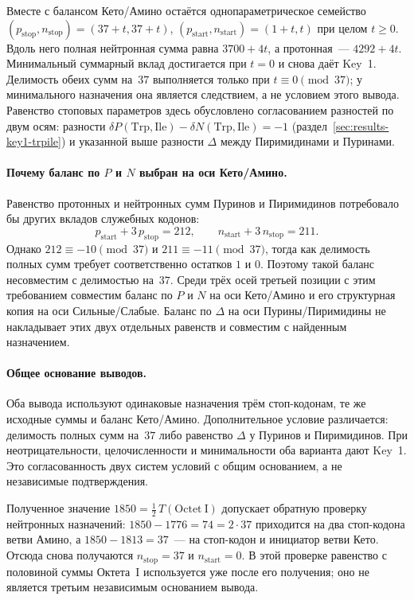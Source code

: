 \documentclass[11pt,a4paper]{article}
\renewcommand{\_}{\origunderscore\allowbreak}
\begin{document}
Вместе с балансом Кето/Амино остаётся однопараметрическое семейство
$(p_{\text{stop}},n_{\text{stop}})=(37+t,37+t)$,
$(p_{\text{start}},n_{\text{start}})=(1+t,t)$ при целом $t\ge0$.
Вдоль него полная нейтронная сумма равна $3700+4t$,
а протонная~--- $4292+4t$. Минимальный суммарный вклад
достигается при $t=0$ и снова даёт Key~1.
Делимость обеих сумм на~$37$ выполняется только при
$t\equiv0\pmod{37}$; у минимального назначения она
является следствием, а не условием этого вывода.
Равенство стоповых параметров здесь обусловлено
согласованием разностей по двум осям: разности
$\delta P(\mathrm{Trp},\mathrm{Ile})-
\delta N(\mathrm{Trp},\mathrm{Ile})=-1$
(раздел~\ref{sec:results-key1-trpile}) и указанной выше
разности $\Delta$ между Пиримидинами и Пуринами.

\paragraph{Почему баланс по $P$ и $N$ выбран на оси Кето/Амино.}
Равенство протонных и нейтронных сумм Пуринов и Пиримидинов
потребовало бы других вкладов служебных кодонов:
\[
p_{\text{start}}+3\,p_{\text{stop}}=212,
\qquad n_{\text{start}}+3\,n_{\text{stop}}=211.
\]
Однако $212\equiv-10\pmod{37}$ и
$211\equiv-11\pmod{37}$, тогда как делимость полных сумм
требует соответственно остатков $1$ и $0$.
Поэтому такой баланс несовместим с делимостью на~$37$.
Среди трёх осей третьей позиции с этим требованием совместим
баланс по $P$ и $N$ на оси Кето/Амино и его структурная
копия на оси Сильные/Слабые. Баланс по $\Delta$ на оси
Пурины/Пиримидины не накладывает этих двух отдельных
равенств и совместим с найденным назначением.

\paragraph{Общее основание выводов.}
Оба вывода используют одинаковые назначения трём стоп-кодонам,
те же исходные суммы и баланс Кето/Амино. Дополнительное
условие различается: делимость полных сумм на~$37$ либо
равенство $\Delta$ у Пуринов и Пиримидинов. При
неотрицательности, целочисленности и минимальности оба
варианта дают Key~1. Это согласованность двух систем
условий с общим основанием, а не независимые подтверждения.

Полученное значение $1850=\tfrac12\,T(\mathrm{Octet~I})$
допускает обратную проверку нейтронных назначений:
$1850-1776=74=2\cdot37$ приходится на два стоп-кодона
ветви Амино, а $1850-1813=37$~--- на стоп-кодон и
инициатор ветви Кето. Отсюда снова получаются
$n_{\text{stop}}=37$ и $n_{\text{start}}=0$.
В этой проверке равенство с половиной суммы Октета~I
используется уже после его получения; оно не является
третьим независимым основанием вывода.
\end{document}
